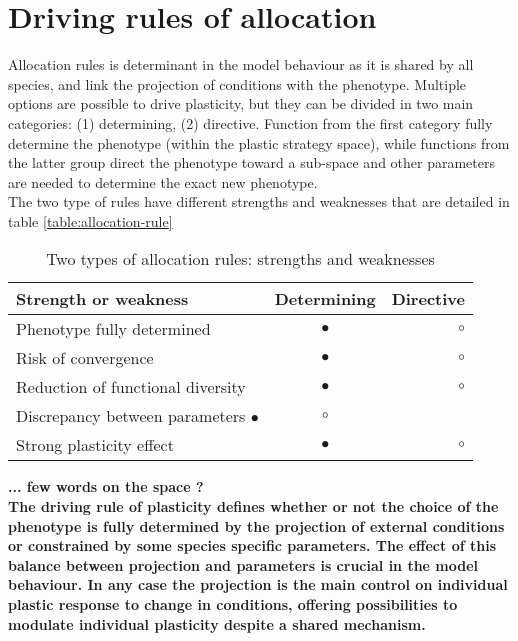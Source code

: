 \section{Driving rules of allocation}\label{section:allocation-rule}

Allocation rules is determinant in the model behaviour as it is shared by all species, and link the projection of conditions with the phenotype. Multiple options are possible to drive plasticity, but they can be divided in two main categories: (1) determining, (2) directive. Function from the first category fully determine the phenotype (within the plastic strategy space), while functions from the latter group direct the phenotype toward a sub-space and other parameters are needed to determine the exact new phenotype.\\
The two type of rules have different strengths and weaknesses that are detailed in table \ref{table:allocation-rule}

\begin{table*}
\caption{Two types of allocation rules: strengths and weaknesses} 
\label{table:state_var_plant}
\begin{center}%
\begin{tabular}{l c r}
Strength or weakness & Determining & Directive \\ 
\hline 
Phenotype fully determined & \textcolor{myGreen}{$\bullet$} & $\circ$ \\
Risk of convergence & $\bullet$ &  $\circ$ \\
Reduction of functional diversity & $\bullet$ &  $\circ$\\
Discrepancy between parameters $\bullet$ &  $\circ$\\
Strong plasticity effect & \textcolor{myGreen}{$\bullet$} & $\circ$
\end{tabular} 
\end{center}
\vspace*{0.5cm}
\end{table*}

\textbf{... few words on the space ?\\
The driving rule of plasticity defines whether or not the choice of the  phenotype is fully determined by the projection of external conditions or constrained by some species specific parameters. The effect of this balance between projection and parameters is crucial in the model behaviour. In any case the projection is the main control on individual plastic response to change in conditions, offering possibilities to modulate individual plasticity despite a shared mechanism.}




